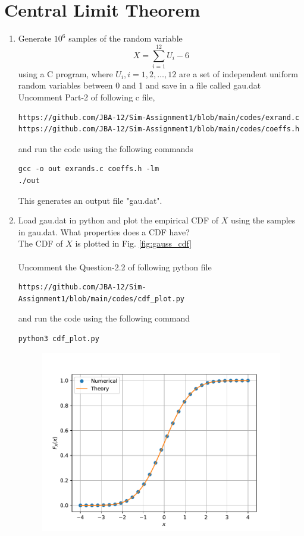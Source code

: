 \documentclass[journal,12pt,twocolumn]{IEEEtran}
\renewcommand\thesection{\arabic{section}}
\begin{document}
\section{Central Limit Theorem}
%
\begin{enumerate}[label=\thesection.\arabic*
,ref=\thesection.\theenumi]
%
\item
Generate $10^6$ samples of the random variable
%
\begin{equation}
X = \sum_{i=1}^{12}U_i -6
\end{equation}
%
using a C program, where $U_i, i = 1,2,\dots, 12$ are  a set of independent uniform random variables between 0 and 1
and save in a file called gau.dat\\
\solution
Uncomment Part-2 of following c file,
\begin{lstlisting}
https://github.com/JBA-12/Sim-Assignment1/blob/main/codes/exrand.c
https://github.com/JBA-12/Sim-Assignment1/blob/main/codes/coeffs.h
\end{lstlisting}
and run the code using the following commands
\begin{lstlisting}
gcc -o out exrands.c coeffs.h -lm
./out
\end{lstlisting}
This generates an output file "gau.dat".\\
\item
Load gau.dat in python and plot the empirical CDF of $X$ using the samples in gau.dat. What properties does a CDF have?
\\
\solution The CDF of $X$ is plotted in Fig. \ref{fig:gauss_cdf} \\\\
Uncomment the Question-2.2 of following python file
\begin{lstlisting}
https://github.com/JBA-12/Sim-Assignment1/blob/main/codes/cdf_plot.py
\end{lstlisting}
and run the code using the following command
\begin{lstlisting}
python3 cdf_plot.py
\end{lstlisting}
\begin{figure}[!htbp]
\centering
\includegraphics[width=\columnwidth]{./figs/gau_cdf}

\end{figure}
\end{enumerate}
\end{document}
